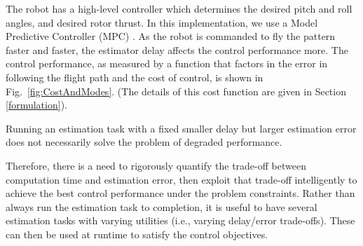 The robot has a high-level controller which determines the desired pitch and roll angles, and desired rotor thrust.
In this implementation, we use a Model Predictive Controller (MPC) \cite{camachoetal04mpc}.
As the robot is commanded to fly the pattern faster and faster, the estimator delay affects the control performance more.
The control performance, as measured by a function that factors in the error in following the flight path and the cost of control, is shown in Fig.~\ref{fig:CostAndModes}.
(The details of this cost function are given in Section \ref{formulation}).

Running an estimation task with a fixed smaller delay but larger estimation error does not necessarily solve the problem of degraded performance.

Therefore, there is a need to rigorously quantify the trade-off between computation time and estimation error, then exploit that trade-off intelligently to achieve the best control performance under the problem constraints.
Rather than always run the estimation task to completion, it is useful to have several estimation tasks with varying utilities (i.e., varying delay/error trade-offs).
These can then be used at runtime to satisfy the control objectives.
